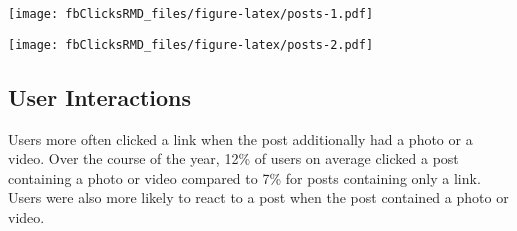 \documentclass[
]{article}
\newenvironment{Shaded}{\begin{snugshade}}{\end{snugshade}}
\newcommand{\CommentTok}[1]{\textcolor[rgb]{0.56,0.35,0.01}{\textit{#1}}}
\newcommand{\DataTypeTok}[1]{\textcolor[rgb]{0.13,0.29,0.53}{#1}}
\newcommand{\KeywordTok}[1]{\textcolor[rgb]{0.13,0.29,0.53}{\textbf{#1}}}
\newcommand{\NormalTok}[1]{#1}
\newcommand{\OperatorTok}[1]{\textcolor[rgb]{0.81,0.36,0.00}{\textbf{#1}}}
\newcommand{\StringTok}[1]{\textcolor[rgb]{0.31,0.60,0.02}{#1}}
\begin{document}
\texttt{[image: fbClicksRMD\_files/figure-latex/posts-1.pdf]}

\begin{Shaded}
\end{Shaded}

\texttt{[image: fbClicksRMD\_files/figure-latex/posts-2.pdf]}

\hypertarget{user-interactions}{%
\subsection{User Interactions}\label{user-interactions}}

Users more often clicked a link when the post additionally had a photo
or a video. Over the course of the year, 12\% of users on average
clicked a post containing a photo or video compared to 7\% for posts
containing only a link. Users were also more likely to react to a post
when the post contained a photo or video.
\end{document}
